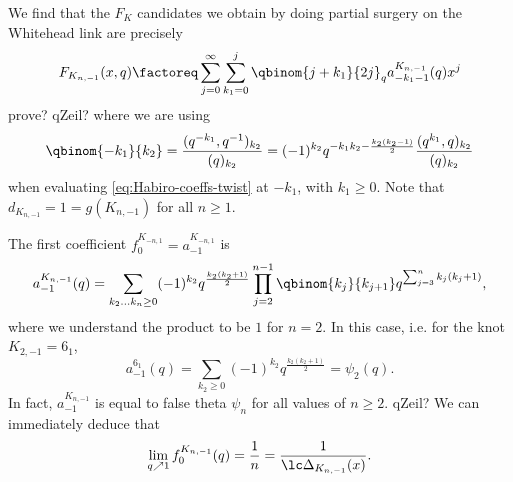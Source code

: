 \documentclass[11pt,e-only]{amsart}
\begin{document}

We find that the $F_K$ candidates we obtain by doing partial surgery on the Whitehead link are precisely
\begin{equation}
    F_{K_{n,-1}}(x,q)\factoreq \sum_{j=0}^\infty \sum_{k_1=0}^j \qbinom{j+k_1}{2j}_q a^{{K_{n,-1}}}_{-k_1-1}(q) x^j
\end{equation} %
\alert{prove? qZeil?} where we are using
\begin{equation}
    \qbinom{-k_1}{k_2}=\frac{(q^{-k_1},q^{-1})_{k_2}}{(q)_{k_2}}=(-1)^{k_2}q^{-k_1k_2-\frac{k_2(k_2-1)}{2}}\frac{(q^{k_1},q)_{k_2}}{(q)_{k_2}}
\end{equation}
when evaluating \eqref{eq:Habiro-coeffs-twist} at $-k_1$, with $k_1\geq 0$. Note that $d_{K_{n,-1}}=1=g(K_{n,-1})$ for all $n\geq 1$.

The first coefficient $f_0^{K_{-n,1}}= a_{-1}^{K_{-n,1}}$ is
\begin{equation}
    a_{-1}^{K_{n,-1}}(q)= \sum_{k_2\dots k_n\geq 0} (-1)^{k_2} q^{\frac{k_2(k_2+1)}{2}}\prod_{j=2}^{n-1} \qbinom{k_j}{k_{j+1}} q^{\sum_{j=3}^{n} k_j(k_j+1)},
\end{equation}
where we understand the product to be $1$ for $n=2$. In this case, i.e. for the knot $K_{2,-1}=6_1$,
\begin{equation}
    a_{-1}^{6_1}(q) = \sum_{k_2\geq 0} (-1)^{k_2} q^{\frac{k_2(k_2+1)}{2}} = \psi_2(q).
\end{equation}
In fact, $a_{-1}^{K_{n,-1}}$ is equal to false theta $\psi_{n}$ for all values of $n\geq 2$. \alert{qZeil?} We can immediately deduce that
\begin{equation}
    \lim_{q\nearrow 1} f_0^{K_{n,-1}}(q)=\frac{1}{n}=\frac{1}{\lc \Delta_{K_{n,-1}}(x)}.
\end{equation}
\end{document}
